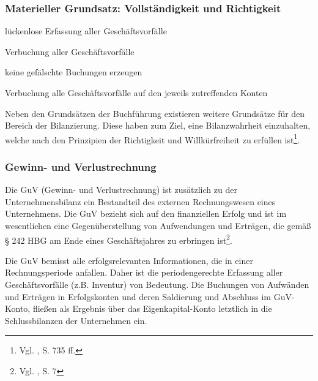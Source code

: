 \subsubsection*{Materieller Grundsatz: Vollständigkeit und Richtigkeit}
\begin{compactitem}
\item  lückenlose Erfassung aller Geschäftsvorfälle
\item  Verbuchung aller Geschäftsvorfälle
\item  keine gefälschte Buchungen erzeugen
\item  Verbuchung alle Geschäftsvorfälle auf den jeweils zutreffenden Konten
\end{compactitem}
Neben den Grundsätzen der Buchführung existieren weitere Grundsätze für den Bereich der Bilanzierung. Diese haben zum Ziel, eine Bilanzwahrheit einzuhalten, welche nach den Prinzipien der Richtigkeit und Willkürfreiheit zu erfüllen ist\footnote{Vgl. \cite{Wohe2000}, S. 735 ff.}.

 

\subsubsection{Gewinn- und Verlustrechnung}
Die GuV (Gewinn- und Verlustrechnung) ist zusätzlich zu der Unternehmensbilanz ein Bestandteil des externen Rechnungswesen eines Unternehmens. Die GuV bezieht sich auf den finanziellen Erfolg und ist im wesentlichen eine Gegenüberstellung von Aufwendungen und Erträgen, die gemäß § 242 HBG am Ende eines Geschäftsjahres zu erbringen ist\footnote{Vgl. \cite{Schuler2006}, S. 7}.

Die GuV bemisst alle erfolgsrelevanten Informationen, die in einer Rechnungsperiode anfallen. Daher ist die periodengerechte Erfassung aller Geschäftsvorfälle (z.B. Inventur) von Bedeutung. Die Buchungen von Aufwänden und Erträgen in Erfolgskonten und deren Saldierung und Abschluss im GuV-Konto, fließen als Ergebnis über das Eigenkapital-Konto letztlich in die Schlussbilanzen der Unternehmen ein.


